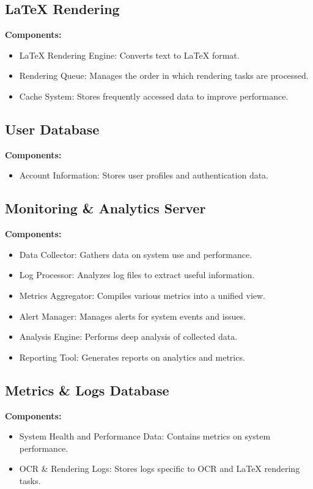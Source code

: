 \documentclass{article}
\begin{document}
\subsection{LaTeX Rendering}
\textbf{Components:}
\begin{itemize}
    \item LaTeX Rendering Engine: Converts text to LaTeX format.
    \item Rendering Queue: Manages the order in which rendering tasks are processed.
    \item Cache System: Stores frequently accessed data to improve performance.
\end{itemize}

\subsection{User Database}
\textbf{Components:}
\begin{itemize}
    \item Account Information: Stores user profiles and authentication data.
\end{itemize}

\subsection{Monitoring \& Analytics Server}
\textbf{Components:}
\begin{itemize}
    \item Data Collector: Gathers data on system use and performance.
    \item Log Processor: Analyzes log files to extract useful information.
    \item Metrics Aggregator: Compiles various metrics into a unified view.
    \item Alert Manager: Manages alerts for system events and issues.
    \item Analysis Engine: Performs deep analysis of collected data.
    \item Reporting Tool: Generates reports on analytics and metrics.
\end{itemize}

\subsection{Metrics \& Logs Database}
\textbf{Components:}
\begin{itemize}
    \item System Health and Performance Data: Contains metrics on system performance.
    \item OCR \& Rendering Logs: Stores logs specific to OCR and LaTeX rendering tasks.
\end{itemize}
\end{document}
